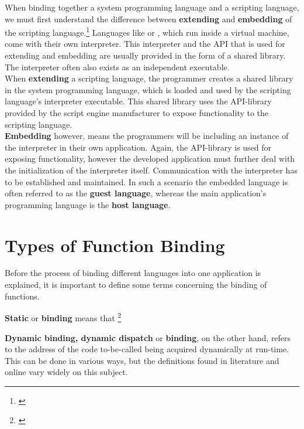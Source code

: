 When binding together a system programming language and a scripting language, we must first understand the difference between \textbf{extending} and \textbf{embedding} of the scripting language.\footnote{\citep{PythonHP}} Languages like  or , which run inside a virtual machine, come with their own interpreter. This interpreter and the API that is used for extending and embedding are usually provided in the form of a shared library. The interpreter often also exists as an independent executable. \\
When \textbf{extending} a scripting language, the programmer creates a shared library in the system programming language, which is loaded and used by the scripting language's interpreter executable. This shared library uses the  API-library provided by the script engine manufacturer to expose functionality to the scripting language.\\
\textbf{Embedding} however, means the programmers will be including an instance of the interpreter in their own application. Again, the API-library is used for exposing \linebreak functionality, however the developed application must further deal with the initialization of the interpreter itself. Communication with the interpreter has to be established and maintained. In such a scenario the embedded language is often referred to as the \linebreak\textbf{guest language}, whereas the main application's programming language is the \linebreak\textbf{host language}.

\section{Types of Function Binding}
\label{sec:TypesOfFunctionBinding}

Before the process of binding different languages into one application is explained, it is important to define some terms concerning the binding of functions.

\textbf{Static} or \textbf{ binding} means that \footnote{\citep[41]{ThinkingInCPP}}

\textbf{Dynamic binding, dynamic dispatch} or \textbf{ binding}, on the other hand, refers to the address of the code to-be-called being acquired dynamically at run-time. This can be done in various ways, but the definitions found in literature and online vary widely on this subject.

